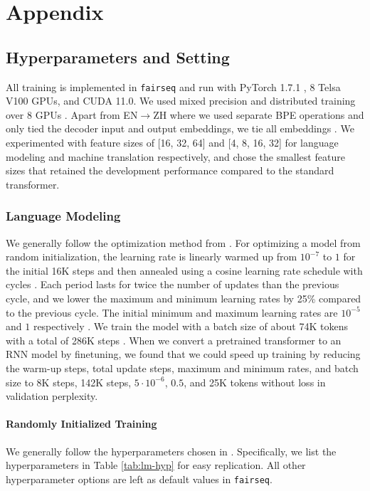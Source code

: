 \documentclass[11pt]{article}
\begin{document}
\section{Appendix}
\subsection{Hyperparameters and Setting}
\label{sec:hyper}
All training is implemented in \texttt{fairseq} \cite{ott-etal-2019-fairseq} and run with PyTorch 1.7.1 \cite{pytorch}, 8 Telsa V100 GPUs, and CUDA 11.0.
We used mixed precision and distributed training over 8 GPUs \cite{micikevicius2018mixed, Ott2018ScalingNM}.
Apart from EN$\rightarrow$ZH where we used separate BPE operations and only tied the decoder input and output embeddings, we tie all embeddings \cite{Press2017UsingTO, Inan2017TyingWV}.
We experimented with feature sizes of [16, 32, 64] and [4, 8, 16, 32] for language modeling and machine translation respectively, and chose the smallest feature sizes that retained the development performance compared to the standard transformer. 

\subsubsection{Language Modeling}
We generally follow the optimization method from \citet{Baevski2019AdaptiveIR}.
For optimizing a model from random initialization, the learning rate is linearly warmed up from $10^{-7}$ to $1$ for the initial 16K steps and then annealed using a cosine learning rate schedule with cycles \cite{cosine}.
Each period lasts for twice the number of updates than the previous cycle, and we lower the maximum and minimum learning rates by 25\% compared to the previous cycle.
The initial minimum and maximum learning rates are $10^{-5}$ and $1$ respectively \cite{Baevski2019AdaptiveIR}.
We train the model with a batch size of about 74K tokens with a total of 286K steps \cite{Baevski2019AdaptiveIR}.
When we convert a pretrained transformer to an RNN model by finetuning, we found that we could speed up training by reducing the warm-up steps, total update steps, maximum and minimum rates, and batch size to 8K steps, 142K steps, $5\cdot10^{-6}$, $0.5$, and 25K tokens without loss in validation perplexity.
\paragraph{Randomly Initialized Training}
We generally follow the hyperparameters chosen in \citet{Baevski2019AdaptiveIR,layerdrop}.
Specifically, we list the hyperparameters in Table \ref{tab:lm-hyp} for easy replication. All other hyperparameter options are left as default values in \texttt{fairseq}.
\end{document}
